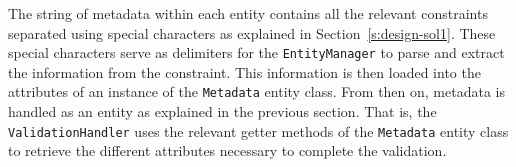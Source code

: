 The string of metadata within each entity contains all the relevant constraints
 separated using special characters as explained in Section~\ref{s:design-sol1}. 
These special characters serve as delimiters for the \texttt{EntityManager} 
to parse and extract the information from the constraint. This information is
then loaded  into the attributes of  an instance of the \texttt{Metadata} entity
class. From then on, metadata is handled as an entity as explained in the
previous section. That is, the \texttt{ValidationHandler} uses the relevant
getter methods of the \texttt{Metadata} entity class to retrieve  the different
attributes necessary to complete the validation.

















